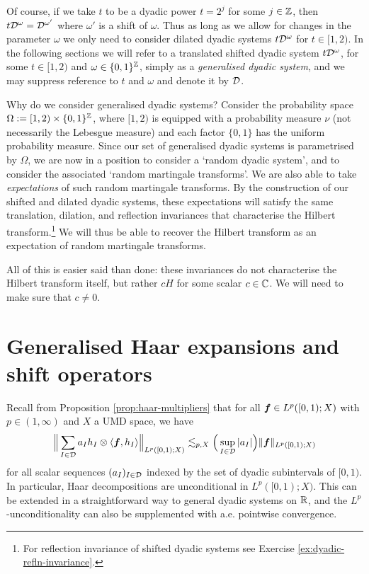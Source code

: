 Of course, if we take $t$ to be a dyadic power $t = 2^{j}$ for some $j \in \mathbb{Z}$, then $t\mathcal{D}^{\omega} = \mathcal{D}^{\omega'}$ where $\omega'$ is a shift of $\omega$.
Thus as long as we allow for changes in the parameter $\omega$ we only need to consider dilated dyadic systems $t\mathcal{D}^{\omega}$ for $t \in [1,2)$.
In the following sections we will refer to a translated shifted dyadic system $t\mathcal{D}^{\omega}$, for some $t \in [1,2)$ and $\omega \in \{0,1\}^{\mathbb{Z}}$, simply as a \emph{generalised dyadic system}, and we may suppress reference to $t$ and $\omega$ and denote it by $\mathcal{D}$.

Why do we consider generalised dyadic systems?
Consider the probability space $\Omega := [1,2) \times \{0,1\}^{\mathbb{Z}}$, where $[1,2)$ is equipped with a probability measure $\nu$ (not necessarily the Lebesgue measure) and each factor $\{0,1\}$ has the uniform probability measure.
Since our set of generalised dyadic systems is parametrised by $\Omega$, we are now in a position to consider a `random dyadic system', and to consider the associated `random martingale transforms'.
We are also able to take \emph{expectations} of such random martingale transforms.
By the construction of our shifted and dilated dyadic systems, these expectations will satisfy the same translation, dilation, and reflection invariances that characterise the Hilbert transform.\footnote{For reflection invariance of shifted dyadic systems see Exercise \ref{ex:dyadic-refln-invariance}.}
We will thus be able to recover the Hilbert transform as an expectation of random martingale transforms.

All of this is easier said than done: these invariances do not characterise the Hilbert transform itself, but rather $cH$ for some scalar $c \in \mathbb{C}$.
We will need to make sure that $c \neq 0$.

\section{Generalised Haar expansions and shift operators}

Recall from Proposition \ref{prop:haar-multipliers} that for all $\bm{f} \in L^p([0,1);X)$ with $p \in (1,\infty)$ and $X$ a UMD space, we have
\begin{equation*}
  \Big\| \sum_{I \in \mathcal{D}} a_{I} h_{I} \otimes \langle \bm{f}, h_{I} \rangle \Big\|_{L^p([0,1);X)} \lesssim_{p,X} \Big(\sup_{I \in \mathcal{D}} |a_{I}| \Big) \|\bm{f}\|_{L^p([0,1);X)}
\end{equation*}
for all scalar sequences $(a_{I})_{I \in \mathcal{D}}$ indexed by the set of dyadic subintervals of $[0,1)$.
In particular, Haar decompositions are unconditional in $L^p([0,1);X)$.
This can be extended in a straightforward way to general dyadic systems on $\mathbb{R}$, and the $L^p$-unconditionality can also be supplemented with a.e. pointwise convergence.

